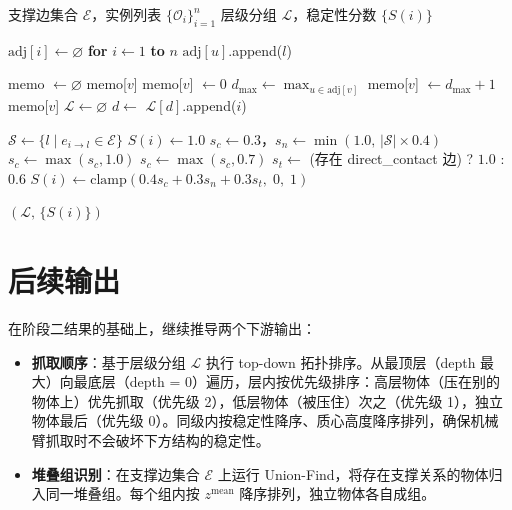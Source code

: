 \documentclass[12pt,a4paper]{article}
\begin{document}
\begin{algorithm}[htbp]
\caption{阶段二：图论驱动的层级推理}
\label{alg:phase2}
\begin{algorithmic}[1]
\Require 支撑边集合 $\mathcal{E}$，实例列表 $\{\mathcal{O}_i\}_{i=1}^{n}$
\Ensure 层级分组 $\mathcal{L}$，稳定性分数 $\{S(i)\}$

\State $\text{adj}[i] \gets \varnothing$ \textbf{for} $i \gets 1$ \textbf{to} $n$
    \State $\text{adj}[u]$.append($l$)
\EndFor

\State memo $\gets \varnothing$
     \Return memo[$v$] \EndIf
        \State memo[$v$] $\gets 0$ 
        \State {}
    \EndIf
    \State $d_{\max} \gets \displaystyle\max_{u \in \text{adj}[v]}$ 
    \State memo[$v$] $\gets d_{\max} + 1$
    \State \Return memo[$v$]
\EndFunction
\State $\mathcal{L} \gets \varnothing$ 
    \State $d \gets$ 
    \State $\mathcal{L}[d]$.append($i$)
\EndFor

    \State $\mathcal{S} \gets \{l \mid e_{i \to l} \in \mathcal{E}\}$ 
        \State $S(i) \gets 1.0$ 
    \Else
        \State $s_c \gets 0.3$，$s_n \gets \min(1.0,\, |\mathcal{S}| \times 0.4)$
             $s_c \gets \max(s_c, 1.0)$
             $s_c \gets \max(s_c, 0.7)$ \EndIf
        \EndFor
        \State $s_t \gets$ (存在 direct\_contact 边) ? $1.0$ : $0.6$
        \State $S(i) \gets \text{clamp}(0.4 s_c + 0.3 s_n + 0.3 s_t,\; 0,\; 1)$
    \EndIf
\EndFor

\State \Return $(\mathcal{L},\, \{S(i)\})$
\end{algorithmic}
\end{algorithm}

\section{后续输出}

在阶段二结果的基础上，继续推导两个下游输出：

\begin{itemize}
    \item \textbf{抓取顺序}：基于层级分组 $\mathcal{L}$ 执行 top-down 拓扑排序。从最顶层（depth 最大）向最底层（depth = 0）遍历，层内按优先级排序：高层物体（压在别的物体上）优先抓取（优先级 2），低层物体（被压住）次之（优先级 1），独立物体最后（优先级 0）。同级内按稳定性降序、质心高度降序排列，确保机械臂抓取时不会破坏下方结构的稳定性。
    \item \textbf{堆叠组识别}：在支撑边集合 $\mathcal{E}$ 上运行 Union-Find，将存在支撑关系的物体归入同一堆叠组。每个组内按 $z^{\text{mean}}$ 降序排列，独立物体各自成组。
\end{itemize}
\end{document}
